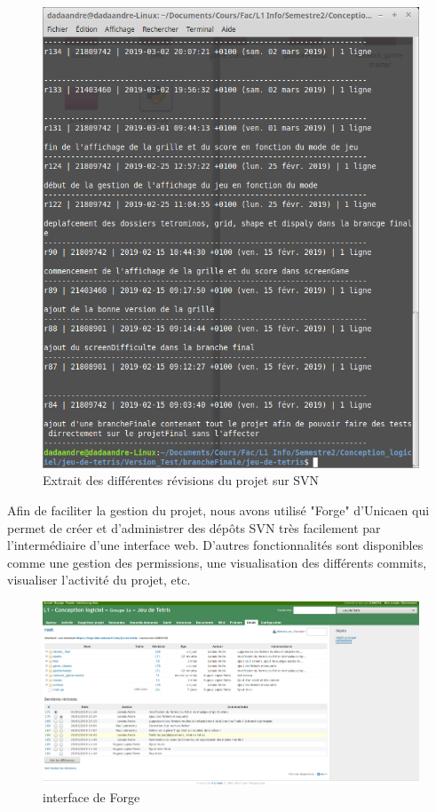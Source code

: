 \documentclass[a4paper, 11pt]{article}
\begin{document}
            \begin{figure}[ht]
                \centering
                \includegraphics[scale=0.25]{images/svnLog.png}
                \caption{Extrait des différentes révisions du projet sur SVN}
            \end{figure}
            
            Afin de faciliter la gestion du projet, nous avons utilisé "Forge" d'Unicaen qui permet de créer et d'administrer des dépôts SVN très facilement par l'intermédiaire d'une interface web. D'autres fonctionnalités sont disponibles comme une gestion des permissions, une visualisation des différents commits, visualiser l'activité du projet, etc.
            
             \begin{figure}[h]
                \centering
                \includegraphics[scale=0.25]{images/forge.png}
                \caption{interface de Forge}
            \end{figure}
            
\end{document}
